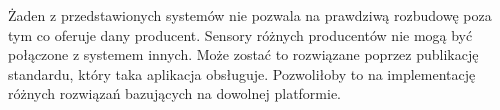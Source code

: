 Żaden z przedstawionych systemów nie pozwala na prawdziwą rozbudowę poza tym co oferuje 
dany producent. Sensory różnych producentów nie mogą być połączone z systemem innych.
Może zostać to rozwiązane poprzez publikację standardu, który taka aplikacja obsługuje.
Pozwoliłoby to na implementację różnych rozwiązań bazujących na dowolnej platformie.

